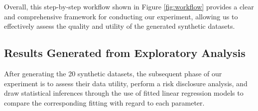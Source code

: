 Overall, this step-by-step workflow shown in Figure \ref{fig:workflow} provides a clear and comprehensive framework for conducting our experiment, allowing us to effectively assess the quality and utility of the generated synthetic datasets.




\subsection{Results Generated from Exploratory Analysis}
\label{subsec:results}
After generating the 20 synthetic datasets, the subsequent phase of our experiment is to assess their data utility, perform a risk disclosure analysis, and draw statistical inferences through the use of fitted linear regression models to compare the corresponding fitting with regard to each parameter.


